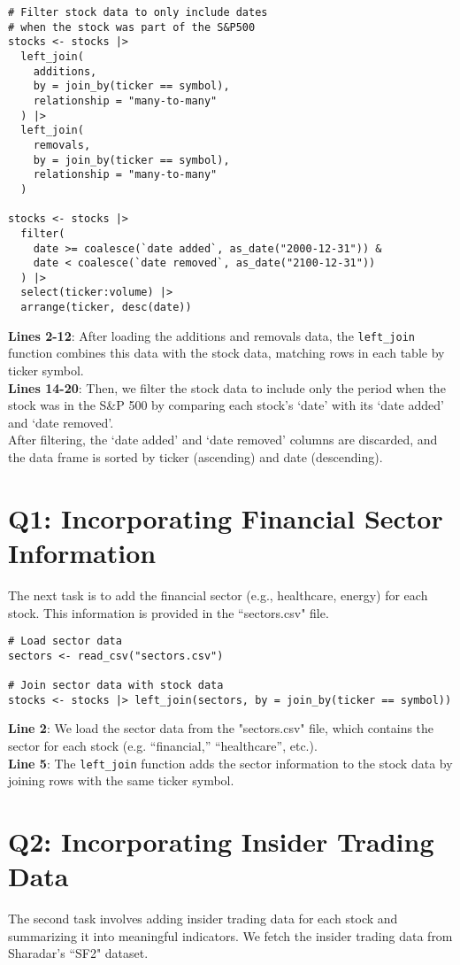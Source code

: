 \documentclass[12pt,letterpaper]{article}
\begin{document}
\begin{verbatim}
# Filter stock data to only include dates
# when the stock was part of the S&P500
stocks <- stocks |>
  left_join(
    additions,
    by = join_by(ticker == symbol),
    relationship = "many-to-many"
  ) |>
  left_join(
    removals,
    by = join_by(ticker == symbol),
    relationship = "many-to-many"
  )

stocks <- stocks |>
  filter(
    date >= coalesce(`date added`, as_date("2000-12-31")) &
    date < coalesce(`date removed`, as_date("2100-12-31"))
  ) |>
  select(ticker:volume) |>
  arrange(ticker, desc(date))
\end{verbatim}
\textbf{Lines 2-12}: After loading the additions and removals data, the \texttt{left\_join} function combines this data with the stock data, matching rows in each table by ticker symbol.\\
\textbf{Lines 14-20}: Then, we filter the stock data to include only the period when the stock was in the S\&P 500 by comparing each stock's `date' with its `date added' and `date removed'.\\
After filtering, the `date added' and `date removed' columns are discarded, and the data frame is sorted by ticker (ascending) and date (descending).

\section{Q1: Incorporating Financial Sector Information}
The next task is to add the financial sector (e.g., healthcare, energy) for
each stock. This information is provided in the ``sectors.csv" file.

\begin{verbatim}
# Load sector data
sectors <- read_csv("sectors.csv")

# Join sector data with stock data
stocks <- stocks |> left_join(sectors, by = join_by(ticker == symbol))
\end{verbatim}
\textbf{Line 2}: We load the sector data from the "sectors.csv" file, which contains the sector for each stock (e.g. ``financial,'' ``healthcare'', etc.).\\
\textbf{Line 5}: The \texttt{left\_join} function adds the sector information to the stock data by joining rows with the same ticker symbol.

\section{Q2: Incorporating Insider Trading Data}
The second task involves adding insider trading data for each
stock and summarizing it into meaningful indicators. We fetch the insider trading
data from Sharadar's ``SF2" dataset.
\end{document}
